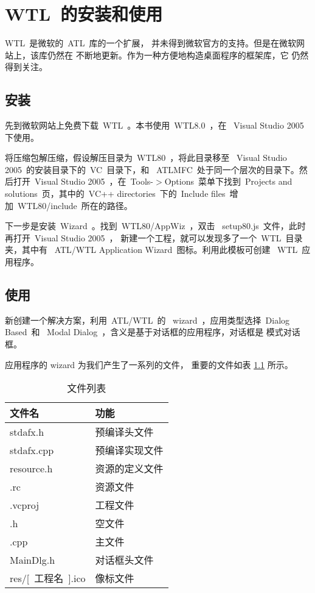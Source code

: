 ﻿%
%

\chapter{WTL~的安装和使用}

WTL~是微软的~ATL~库的一个扩展，
并未得到微软官方的支持。但是在微软网站上，该库仍然在
不断地更新。作为一种方便地构造桌面程序的框架库，它
仍然得到关注。

\section{安装}

先到微软网站上免费下载~WTL~。本书使用~WTL8.0~，在
~Visual Studio 2005~
下使用。


将压缩包解压缩，假设解压目录为~WTL80~，将此目录移至
~Visual Studio 2005~的安装目录下的~VC~目录下，和
~ATLMFC~处于同一个层次的目录下。然后打开~Visual Studio
2005~，在~Tools-$>$Options~菜单下找到~Projects and
solutions~页，其中的~VC++ directories~下的~Include
files~增加~WTL80/include~所在的路径。


下一步是安装~Wizard~。找到~WTL80/AppWiz~，双击
~setup80.js~文件，此时再打开~Visual Studio 2005~，
新建一个工程，就可以发现多了一个~WTL~目录夹，其中有
~ATL/WTL Application Wizard~图标。利用此模板可创建
~WTL~应用程序。


\section{使用}

新创建一个解决方案，利用~ATL/WTL~的
~wizard~，应用类型选择~Dialog Based~和
~Modal Dialog~，含义是基于对话框的应用程序，对话框是
模式对话框。

应用程序的 wizard 为我们产生了一系列的文件，
重要的文件如表 \ref{tab:setup:files} 所示。

\begin{table}[h]
  \centering
  \caption{文件列表}\label{tab:setup:files}
\begin{tabular}{|l|l|}
  \hline
  \textbf{文件名} &  \textbf{功能} \\
  \hline\hline
  stdafx.h &  预编译头文件 \\
  \hline
  stdafx.cpp &  预编译实现文件 \\
  \hline
  resource.h &  资源的定义文件 \\
  \hline
  [~工程名~].rc & 资源文件 \\
  \hline
  [~工程名~].vcproj & 工程文件 \\
  \hline
  [~工程名~].h & 空文件 \\
  \hline
  [~工程名~].cpp & 主文件 \\
  \hline
  MainDlg.h & 对话框头文件 \\
  \hline
  res/[~工程名~].ico & 像标文件 \\
  \hline
\end{tabular}

\end{table}

